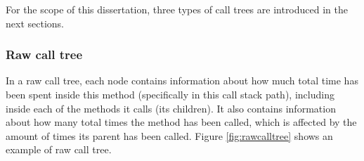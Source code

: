 \noindent For the scope of this dissertation, three types of call trees are introduced in the next sections.

\subsubsection{Raw call tree}
In a raw call tree, each node contains information about how much total time has been spent inside this method (specifically in this call stack path), including inside each of the methods it calls (its children). It also contains information about how many total times the method has been called, which is affected by the amount of times its parent has been called. Figure \ref{fig:rawcalltree} shows an example of raw call tree.

\begin{figure}
  \centering
\end{figure}

